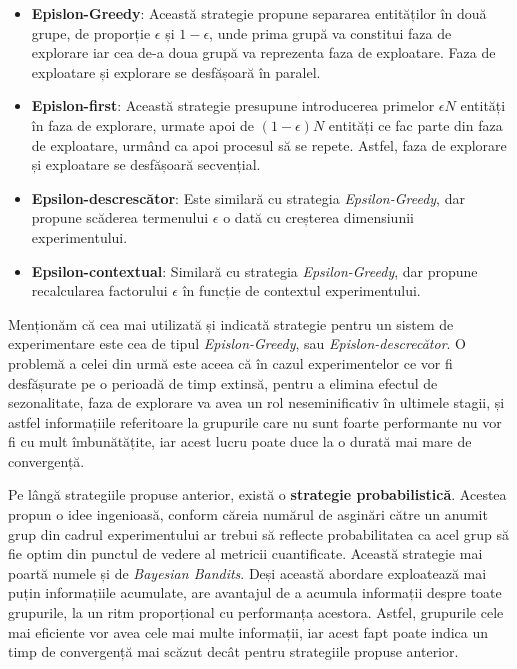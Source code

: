 \begin{itemize}
	\item \textbf{Epislon-Greedy}: Această strategie propune separarea entităților în două grupe, de proporție $\epsilon$ și $1 - \epsilon$, unde prima grupă va constitui faza de explorare iar cea de-a doua grupă va reprezenta faza de exploatare. Faza de exploatare și explorare se desfășoară în paralel.
	\item \textbf{Epislon-first}: Această strategie presupune introducerea primelor $\epsilon N$ entități în faza de explorare, urmate apoi de $(1-\epsilon)N$ entități ce fac parte din faza de exploatare, urmând ca apoi procesul să se repete. Astfel, faza de explorare și exploatare se desfășoară secvențial.
	\item \textbf{Epsilon-descrescător}: Este similară cu strategia \textit{Epsilon-Greedy}, dar propune scăderea termenului $\epsilon$ o dată cu creșterea dimensiunii experimentului.
	\item \textbf{Epsilon-contextual}: Similară cu strategia \textit{Epsilon-Greedy}, dar propune recalcularea factorului $\epsilon$ în funcție de contextul experimentului.
\end{itemize}

Menționăm că cea mai utilizată și indicată strategie pentru un sistem de experimentare este cea de tipul \textit{Epislon-Greedy}, sau \textit{Epislon-descrecător}. O problemă a celei din urmă este aceea că în cazul experimentelor ce vor fi desfășurate pe o perioadă de timp extinsă, pentru a elimina efectul de sezonalitate, faza de explorare va avea un rol neseminificativ în ultimele stagii, și astfel informațiile referitoare la grupurile care nu sunt foarte performante nu vor fi cu mult îmbunătățite, iar acest lucru poate duce la o durată mai mare de convergență.

Pe lângă strategiile propuse anterior, există o \textbf{strategie probabilistică}. Acestea propun o idee ingenioasă, conform căreia numărul de asginări către un anumit grup din cadrul experimentului ar trebui să reflecte probabilitatea ca acel grup să fie optim din punctul de vedere al metricii cuantificate. Această strategie mai poartă numele și de \textit{Bayesian Bandits}. Deși această abordare exploatează mai puțin informațiile acumulate, are avantajul de a acumula informații despre toate grupurile, la un ritm proporțional cu performanța acestora. Astfel, grupurile cele mai eficiente vor avea cele mai multe informații, iar acest fapt poate indica un timp de convergență mai scăzut decât pentru strategiile propuse anterior.

